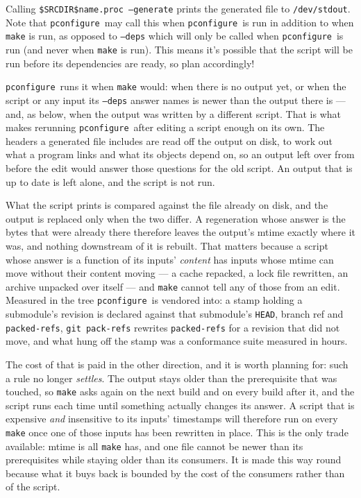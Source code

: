 \documentclass{article}
\newcommand{\pconfigure}{\texttt{pconfigure}}
\begin{document}
Calling \texttt{\$SRCDIR\$name.proc --generate} prints the generated
file to \texttt{/dev/stdout}.  Note that \pconfigure\ may call this
when \pconfigure\ is run in addition to when \texttt{make} is run, as
opposed to \texttt{--deps} which will only be called when
\pconfigure\ is run (and never when \texttt{make} is run).  This means
it's possible that the script will be run before its dependencies are
ready, so plan accordingly!

\pconfigure\ runs it when \texttt{make} would: when there is no output
yet, or when the script or any input its \texttt{--deps} answer names
is newer than the output there is --- and, as below, when the output
was written by a different script.  That is what makes rerunning
\pconfigure\ after editing a script enough on its own.  The headers a
generated file includes are read off the output on disk, to work out
what a program links and what its objects depend on, so an output left
over from before the edit would answer those questions for the old
script.  An output that is up to date is left alone, and the script is
not run.

What the script prints is compared against the file already on disk, and
the output is replaced only when the two differ.  A regeneration whose
answer is the bytes that were already there therefore leaves the
output's mtime exactly where it was, and nothing downstream of it is
rebuilt.  That matters because a script whose answer is a function of
its inputs' \emph{content} has inputs whose mtime can move without their
content moving --- a cache repacked, a lock file rewritten, an archive
unpacked over itself --- and \texttt{make} cannot tell any of those from
an edit.  Measured in the tree \pconfigure\ is vendored into: a stamp
holding a submodule's revision is declared against that submodule's
\texttt{HEAD}, branch ref and \texttt{packed-refs}, \texttt{git
pack-refs} rewrites \texttt{packed-refs} for a revision that did not
move, and what hung off the stamp was a conformance suite measured in
hours.

The cost of that is paid in the other direction, and it is worth
planning for: such a rule no longer \emph{settles}.  The output stays
older than the prerequisite that was touched, so \texttt{make} asks
again on the next build and on every build after it, and the script runs
each time until something actually changes its answer.  A script that is
expensive \emph{and} insensitive to its inputs' timestamps will
therefore run on every \texttt{make} once one of those inputs has been
rewritten in place.  This is the only trade available: mtime is all
\texttt{make} has, and one file cannot be newer than its prerequisites
while staying older than its consumers.  It is made this way round
because what it buys back is bounded by the cost of the consumers rather
than of the script.
\end{document}
